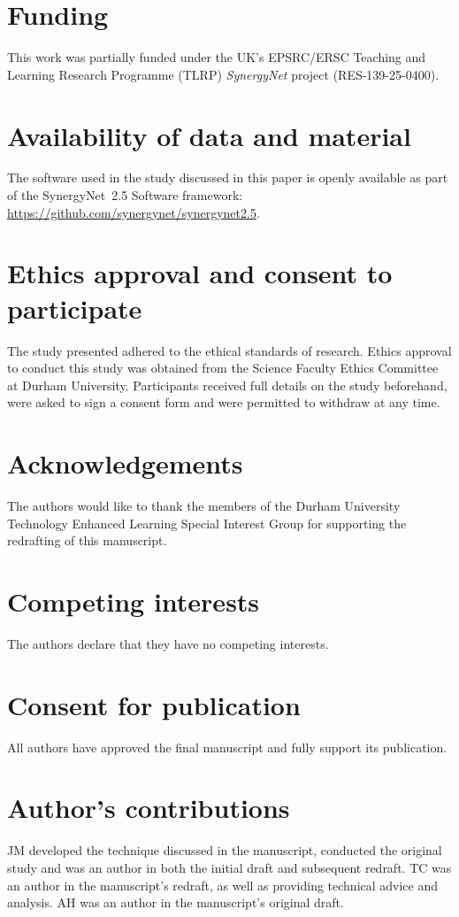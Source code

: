 \documentclass{bmcart}
\begin{document}
\begin{backmatter}

\section*{Funding}
This work was partially funded under the UK's EPSRC/ERSC Teaching and Learning Research Programme (TLRP) {\emph{SynergyNet}} project (RES-139-25-0400).

\section*{Availability of data and material}
The software used in the study discussed in this paper is openly available as part of the SynergyNet~2.5 Software framework: \url{https://github.com/synergynet/synergynet2.5}.

\section*{Ethics approval and consent to participate}
The study presented adhered to the ethical standards of research. 
Ethics approval to conduct this study was obtained from the Science Faculty Ethics Committee at Durham University.
Participants received full details on the study beforehand, were asked to sign a consent form and were permitted to withdraw at any time.

\section*{Acknowledgements}
The authors would like to thank the members of the Durham University Technology Enhanced Learning Special Interest Group for supporting the redrafting of this manuscript.

\section*{Competing interests}
The authors declare that they have no competing interests.

\section*{Consent for publication }
All authors have approved the final manuscript and fully support its publication.

\section*{Author's contributions}
JM developed the technique discussed in the manuscript, conducted the original study and was an author in both the initial draft and subsequent redraft.
TC was an author in the manuscript's redraft, as well as providing technical advice and analysis.
AH was an author in the manuscript's original draft.


\end{backmatter}
\end{document}
